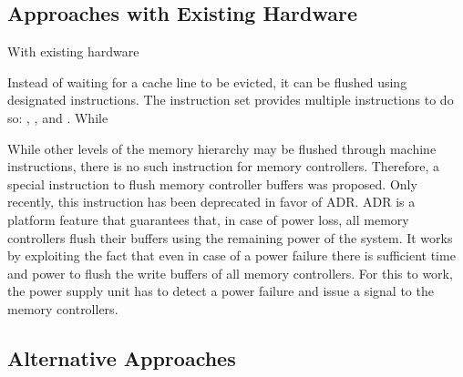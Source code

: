 \subsection{Approaches with Existing Hardware}

With existing hardware


Instead of waiting for a cache line to be evicted, it can be flushed using
designated instructions. The  instruction set provides multiple
instructions to do so: , , and .
While 


While other levels of the memory hierarchy may be flushed through machine
instructions, there is no such instruction for memory controllers. Therefore,
 a special instruction to flush memory controller buffers was
proposed. Only recently, this instruction has been deprecated in favor of
ADR. ADR is a platform feature that guarantees that, in case of power
loss, all memory controllers flush their buffers using the remaining power of
the system. It works by exploiting the fact that even in case of a power failure
there is sufficient time and power to flush the write buffers of all memory
controllers. For this to work, the power supply unit has to detect a power
failure and issue a signal to the memory controllers.

\subsection{Alternative Approaches}

